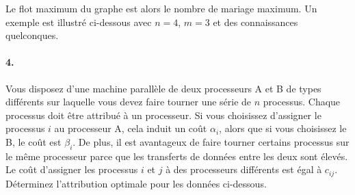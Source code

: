 \begin{solution}
  Le flot maximum du graphe est alors le nombre de mariage maximum.
  Un exemple est illustré ci-dessous avec $n = 4$, $m = 3$ et des connaissances quelconques.
  \begin{center}
  \end{center}
\end{solution}

\paragraph{4. } Vous disposez d'une machine parallèle de deux processeurs A et B de types différents sur laquelle vous devez faire tourner une série de $n$ processus. Chaque processus doit être attribué à un processeur. Si vous choisissez d'assigner le processus $i$ au processeur A, cela induit un coût $\alpha_i$, alors que si vous choisissez le B, le coût est $\beta_i$. De plus, il est avantageux de faire tourner certains processus sur le même processeur parce que les transferts de données entre les deux sont élevés. Le coût d'assigner les processus $i$ et $j$ à des processeurs différents est égal à $c_{ij}$. Déterminez l'attribution optimale pour les données ci-dessous. 

